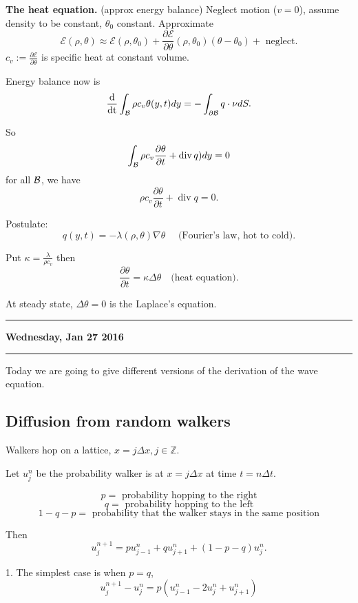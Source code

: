 \documentclass[11pt]{amsart}%
\newcommand\Z{\mathbb{Z}} \newcommand\N{\mathbb{N}} \newcommand\C{\mathbb{C}}
\newcommand\cE{\mathcal{E}}
\DeclareMathOperator{\dt}{\frac{d}{dt}}
\DeclareMathOperator{\dive}{div}
\begin{document}
{\bf The heat equation.} (approx energy balance) Neglect motion ($v=0$), assume density to be constant, $\theta_0$ constant. Approximate
$$\cE(\rho,\theta) \approx \cE(\rho,\theta_0) + \frac{\partial \cE}{\partial \theta}(\rho,\theta_0)(\theta-\theta_0) + \text{ neglect}.$$
$c_v:=\frac{\partial \cE}{\partial \theta}$ is specific heat at constant volume.

Energy balance now is
$$\dt \int_{\cB} \rho c_v \theta(y,t)dy= -\int_{\partial \cB} q\cdot \nu dS.$$

So
$$\int_{\cB} \rho c_v\frac{\partial \theta}{\partial t} +\dive q) dy =0$$ for all $\mathcal{B}$, we have
$$ \rho c_v \frac{\partial \theta}{\partial t} +\dive q =0.$$

Postulate: $$q(y,t) = -\lambda(\rho,\theta)\nabla \theta \quad \text{ (Fourier's law, hot to cold)}.$$

Put $\kappa = \frac{\lambda}{\rho c_v}$ then
$$\frac{\partial \theta}{\partial t} =\kappa \Delta \theta \quad \text{(heat equation)}.$$

At steady state, $\Delta \theta =0$ is the Laplace's equation.

\begin{center}\rule{0.5\linewidth}{\linethickness}\end{center}

\textbf{Wednesday, Jan 27 2016}

\begin{center}\rule{0.5\linewidth}{\linethickness}\end{center}

Today we are going to give different versions of the derivation of the wave equation.

\subsection*{Diffusion from random walkers}
Walkers hop on a lattice, $x=j\Delta x, j\in \Z$. 

Let $u^n_j$ be the probability walker is at $x=j\Delta x$ at time $t=n\Delta t$.

$$p = \text{ probability hopping to the right}$$
$$q = \text{ probability hopping to the left}$$
$$1-q-p = \text{ probability that the walker stays in the same position}$$

Then $$u_j^{n+1}= p u_{j-1}^n + q u^n_{j+1} + (1-p-q)u^n_j.$$

1. The simplest case is when $p=q$,
$$u_j^{n+1}-u_j^n = p(u^n_{j-1} - 2u_j^n + u^n_{j+1})$$
\end{document}
